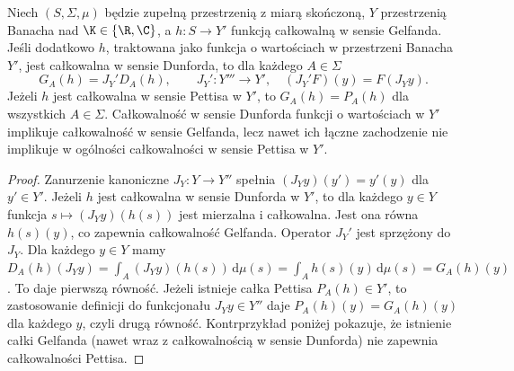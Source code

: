 \begin{stwierdzenie}
\label{prop:gelfand-dunford-restriction15b}
Niech $(S,\Sigma,\mu)$ będzie zupełną przestrzenią
z miarą skończoną, $Y$ przestrzenią Banacha nad
$\K\in\{\R,\C\}$, a $h:S\to Y'$ funkcją całkowalną
w sensie Gelfanda. Jeśli dodatkowo $h$, traktowana jako
funkcja o wartościach w przestrzeni Banacha $Y'$, jest
całkowalna w sensie Dunforda, to dla każdego $A\in\Sigma$
\[
 G_A(h)=J_Y' D_A(h),
 \qquad J_Y':Y'''\to Y',\quad
 (J_Y'F)(y)=F(J_Yy).
\]
Jeżeli $h$ jest całkowalna w sensie Pettisa w $Y'$, to
$G_A(h)=P_A(h)$ dla wszystkich $A\in\Sigma$.
Całkowalność w sensie Dunforda funkcji o wartościach
w $Y'$ implikuje całkowalność w sensie Gelfanda, lecz
nawet ich łączne zachodzenie nie implikuje w ogólności
całkowalności w sensie Pettisa w $Y'$.
\end{stwierdzenie}
\begin{proof}
Zanurzenie kanoniczne $J_Y:Y\to Y''$ spełnia
$(J_Yy)(y')=y'(y)$ dla $y'\in Y'$.
Jeżeli $h$ jest całkowalna w sensie Dunforda w $Y'$,
to dla każdego $y\in Y$ funkcja $s\mapsto(J_Yy)(h(s))$
jest mierzalna i całkowalna. Jest ona równa $h(s)(y)$,
co zapewnia całkowalność Gelfanda.
Operator $J_Y'$ jest sprzężony do $J_Y$.
Dla każdego $y\in Y$ mamy
$D_A(h)(J_Yy)=\int_A(J_Yy)(h(s))\,\mathrm d\mu(s)
=\int_Ah(s)(y)\,\mathrm d\mu(s)=G_A(h)(y)$.
To daje pierwszą równość. Jeżeli istnieje całka Pettisa
$P_A(h)\in Y'$, to zastosowanie definicji do funkcjonału
$J_Yy\in Y''$ daje $P_A(h)(y)=G_A(h)(y)$
dla każdego $y$, czyli drugą równość. Kontrprzykład
poniżej pokazuje, że istnienie całki Gelfanda (nawet
wraz z całkowalnością w sensie Dunforda) nie zapewnia
całkowalności Pettisa.
\end{proof}

